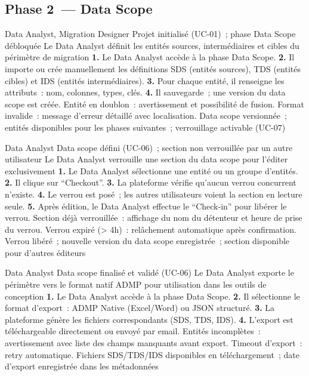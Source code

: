 \subsection*{Phase 2~--- Data Scope}

  {Data Analyst, Migration Designer}
  {Projet initialisé (UC-01)~; phase Data Scope débloquée}
  {Le Data Analyst définit les entités sources, intermédiaires et cibles du périmètre de migration}
  {\textbf{1.} Le Data Analyst accède à la phase Data Scope. \textbf{2.} Il importe ou crée manuellement les définitions SDS (entités sources), TDS (entités cibles) et IDS (entités intermédiaires). \textbf{3.} Pour chaque entité, il renseigne les attributs~: nom, colonnes, types, clés. \textbf{4.} Il sauvegarde~; une version du data scope est créée.}
  {Entité en doublon~: avertissement et possibilité de fusion. Format invalide~: message d'erreur détaillé avec localisation.}
  {Data scope versionnée~; entités disponibles pour les phases suivantes~; verrouillage activable (UC-07)}

  {Data Analyst}
  {Data scope défini (UC-06)~; section non verrouillée par un autre utilisateur}
  {Le Data Analyst verrouille une section du data scope pour l'éditer exclusivement}
  {\textbf{1.} Le Data Analyst sélectionne une entité ou un groupe d'entités. \textbf{2.} Il clique sur ``Checkout''. \textbf{3.} La plateforme vérifie qu'aucun verrou concurrent n'existe. \textbf{4.} Le verrou est posé~; les autres utilisateurs voient la section en lecture seule. \textbf{5.} Après édition, le Data Analyst effectue le ``Check-in'' pour libérer le verrou.}
  {Section déjà verrouillée~: affichage du nom du détenteur et heure de prise du verrou. Verrou expiré (> 4h)~: relâchement automatique après confirmation.}
  {Verrou libéré~; nouvelle version du data scope enregistrée~; section disponible pour d'autres éditeurs}

  {Data Analyst}
  {Data scope finalisé et validé (UC-06)}
  {Le Data Analyst exporte le périmètre vers le format natif ADMP pour utilisation dans les outils de conception}
  {\textbf{1.} Le Data Analyst accède à la phase Data Scope. \textbf{2.} Il sélectionne le format d'export~: ADMP Native (Excel/Word) ou JSON structuré. \textbf{3.} La plateforme génère les fichiers correspondants (SDS, TDS, IDS). \textbf{4.} L'export est téléchargeable directement ou envoyé par email.}
  {Entités incomplètes~: avertissement avec liste des champs manquants avant export. Timeout d'export~: retry automatique.}
  {Fichiers SDS/TDS/IDS disponibles en téléchargement~; date d'export enregistrée dans les métadonnées}

